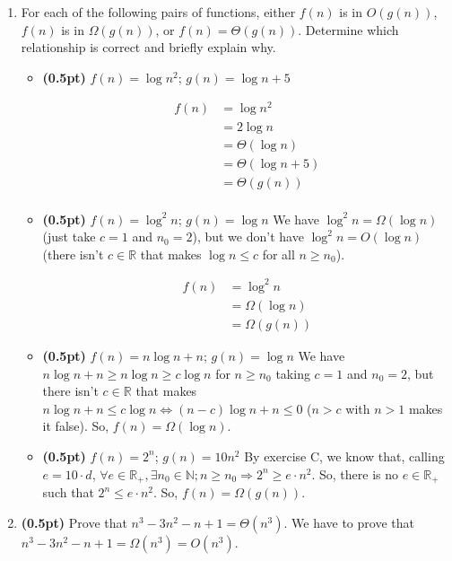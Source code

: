 \documentclass{article}
\begin{document}
\begin{enumerate}[label=\Alph*]
  \item For each of the following pairs of functions, either $f(n)$ is in $O(g(n))$, $f(n)$ is in $\Omega(g(n))$, or $f(n) = \Theta(g(n))$. Determine which relationship is correct and briefly explain why.
    \begin{itemize}
      \item \textbf{(0.5pt)} $f(n) = \log n^2$; $g(n) = \log n + 5$
      
      \begin{equation*}
      \begin{aligned}
        f(n) &= \log n^2 \\
        &= 2\log n \\
        &= \Theta(\log n) \\
        &= \Theta(\log n + 5) \\
        &= \Theta(g(n)) \\
      \end{aligned}
    \end{equation*}
    
      \item \textbf{(0.5pt)} $f(n) = \log^2 n$; $g(n) = \log n$
      \bigbreak
      We have $\log^2 n = \Omega(\log n)$ (just take $c = 1$ and $n_0 = 2$), but we don't have $\log^2 n = O(\log n)$ (there isn't $c \in \mathbb{R}$ that makes $\log n \le c$ for all $n \ge n_0$).
      
      \begin{equation*}
      \begin{aligned}
        f(n) &= \log^2 n \\
        &= \Omega(\log n) \\
        &= \Omega(g(n))
      \end{aligned}
    \end{equation*}
    
      \item \textbf{(0.5pt)} $f(n) = n\log n + n$; $g(n) = \log n$
      \bigbreak
      We have $n\log n + n \ge n\log n \ge c\log n$ for $n \ge n_0$ taking $c = 1$ and $n_0 = 2$, but there isn't $c \in \mathbb{R}$ that makes $n\log n + n \le c\log n \iff (n - c)\log n + n \le 0$ ($n > c$ with $n > 1$ makes it false). So, $f(n) = \Omega(\log n)$.
    \bigbreak
      \item \textbf{(0.5pt)} $f(n) = 2^n$; $g(n) = 10n^2$
      \bigbreak
      By exercise C, we know that, calling $e = 10\cdot d$, $\forall e \in \mathbb{R}_+, \exists n_0 \in \mathbb{N}; n\ge n_0 \Rightarrow 2^n \ge e \cdot n^2$. So, there is no $e \in \mathbb{R}_+$ such that $2^n \le e\cdot n^2$. So, $f(n) = \Omega(g(n))$.
    \end{itemize}
    \bigbreak
  \item \textbf{(0.5pt)} Prove that $n^3 -3n^2 -n+1 = \Theta(n^3)$.
  \bigbreak
  We have to prove that $n^3 -3n^2 -n+1 = \Omega(n^3) = O(n^3)$.
  

\end{enumerate}
\end{document}
